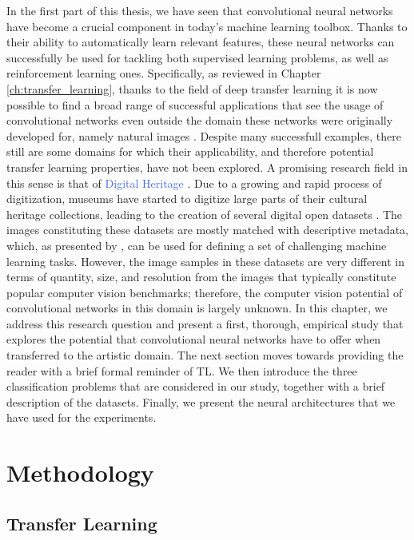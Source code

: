 In the first part of this thesis, we have seen that convolutional neural networks have become a crucial component in today's machine learning toolbox. Thanks to their ability to automatically learn relevant features, these neural networks can successfully be used for tackling both supervised learning problems, as well as reinforcement learning ones. Specifically, as reviewed in Chapter \ref{ch:transfer_learning}, thanks to the field of deep transfer learning it is now possible to find a broad range of successful applications that see the usage of convolutional networks even outside the domain these networks were originally developed for, namely natural images \cite{kornblith2018better}. Despite many successfull examples, there still are some domains for which their applicability, and therefore potential transfer learning properties, have not been explored. A promising research field in this sense is that of \textcolor{RoyalBlue}{Digital Heritage} \cite{parry2005digital}. Due to a growing and rapid process of digitization, museums have started to digitize large parts of their cultural heritage collections, leading to the creation of several digital open datasets \cite{allen2000collaboration, mensink2014rijksmuseum}. The images constituting these datasets are mostly matched with descriptive metadata, which, as presented by \citet{mensink2014rijksmuseum}, can be used for defining a set of challenging machine learning tasks. However, the image samples in these datasets are very different in terms of quantity, size, and resolution from the images that typically constitute popular computer vision benchmarks; therefore, the computer vision potential of convolutional networks in this domain is largely unknown. In this chapter, we address this research question and present a first, thorough, empirical study that explores the potential that convolutional neural networks have to offer when transferred to the artistic domain. The next section moves towards providing the reader with a brief formal reminder of TL. We then introduce the three classification problems that are considered in our study, together with a brief description of the datasets. Finally, we present the neural architectures that we have used for the experiments. 

\section{Methodology}
\label{sec:ch_4_methods}
\subsection{Transfer Learning}
\label{subsec:tl}


